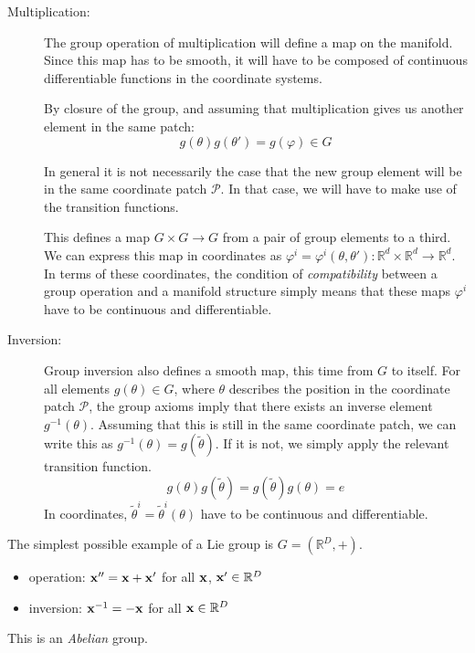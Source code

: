 \begin{description}
  \item[Multiplication:] The group operation of multiplication will define a map on the manifold. Since this map has to be smooth, it will have to be composed of continuous differentiable functions in the coordinate systems.

  By closure of the group, and assuming that multiplication gives us another element in the same patch:
  \begin{equation}
    g(\theta) g(\theta') = g(\varphi) \in G
  \end{equation}
  \begin{leftbar}
    \begin{remark}
      In general it is not necessarily the case that the new group element will be in the same coordinate patch $\mathcal{P}$. In that case, we will have to make use of the transition functions.
    \end{remark}
  \end{leftbar}
  This defines a map $G \times G \to G$ from a pair of group elements to a third.
  We can express this map in coordinates as $\varphi^i = \varphi^i(\theta, \theta'): \mathbb{R}^d \times \mathbb{R}^d \to \mathbb{R}^d$.
  In terms of these coordinates, the condition of \emph{compatibility} between a group operation and a manifold structure simply means that these maps $\varphi^i$ have to be continuous and differentiable.

  \item[Inversion:] Group inversion also defines a smooth map, this time from $G$ to itself.
  For all elements $g(\theta) \in G$, where $\theta$ describes the position in the coordinate patch $\mathcal{P}$, the group axioms imply that there exists an inverse element $g^{-1}(\theta)$. Assuming that this is still in the same coordinate patch, we can write this as $g^{-1}(\theta) = g(\widetilde \theta)$. If it is not, we simply apply the relevant transition function.
  \begin{equation}
    g(\theta) g(\widetilde \theta) = g(\widetilde \theta) g(\theta) = e
  \end{equation}
  In coordinates, $\widetilde \theta^i = \widetilde \theta^i(\theta)$ have to be continuous and differentiable.
\end{description}

\begin{example}[]
  The simplest possible example of a Lie group is $G = (\mathbb{R}^D, +)$.
  \begin{itemize}
    \item operation: $\vb{x}'' = \vb{x} + \vb{x}'$ for all $\vb{x}$, $\vb{x}' \in \mathbb{R}^D$
    \item inversion: $\vb{x}^{-1} = -\vb{x}$ for all $\vb{x} \in \mathbb{R}^D$
  \end{itemize}
  This is an \emph{Abelian} group.
\end{example}
